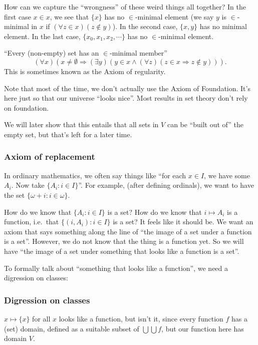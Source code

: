 \documentclass[a4paper]{article}
\begin{document}
How can we capture the ``wrongness'' of these weird things all together? In the first case $x\in x$, we see that $\{x\}$ has no $\in$-minimal element (we say $y$ is $\in$-minimal in $x$ if $(\forall z\in x)(z\not\in y)$). In the second case, $\{x, y\}$ has no minimal element. In the last case, $\{x_0, x_1, x_2, \cdots\}$ has no $\in$-minimal element.


\begin{axiom}
  ``Every (non-empty) set has an $\in$-minimal member''
  \[
    (\forall x)(x\not= \emptyset \Rightarrow (\exists y)(y\in x\wedge (\forall z)(z\in x \Rightarrow z\not\in y))).
  \]
  This is sometimes known as the Axiom of regularity.
\end{axiom}
Note that most of the time, we don't actually use the Axiom of Foundation. It's here just so that our universe ``looks nice''. Most results in set theory don't rely on foundation.

We will later show that this entails that all sets in $V$ can be ``built out of'' the empty set, but that's left for a later time.

\subsubsection*{Axiom of replacement}
In ordinary mathematics, we often say things like ``for each $x\in I$, we have some $A_i$. Now take $\{A_i: i\in I\}$''. For example, (after defining ordinals), we want to have the set $\{\omega + i: i\in \omega\}$.

How do we know that $\{A_i: i\in I\}$ is a set? How do we know that $i\mapsto A_i$ is a function, i.e.\ that $\{(i, A_i): i\in I\}$ is a set? It feels like it should be. We want an axiom that says something along the line of ``the image of a set under a function is a set''. However, we do not know that the thing is a function yet. So we will have ``the image of a set under something that looks like a function is a set''.

To formally talk about ``something that looks like a function'', we need a digression on classes:

\subsubsection*{Digression on classes}
$x\mapsto \{x\}$ for all $x$ looks like a function, but isn't it, since every function $f$ has a (set) domain, defined as a suitable subset of $\bigcup \bigcup f$, but our function here has domain $V$.
\end{document}
